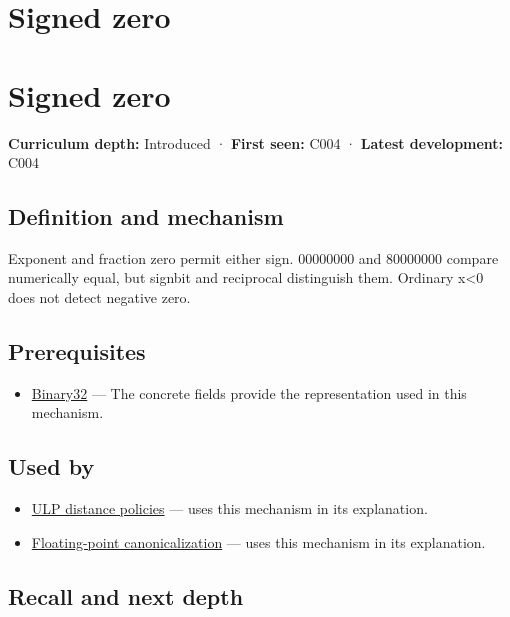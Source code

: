 \hypertarget{appendix-3a048f032c1f}{}
\section*{Signed zero}
\section{Signed zero}\label{appendix-3a048f032c1f-signed-zero}

\textbf{Curriculum depth:} Introduced · \textbf{First seen:} C004 · \textbf{Latest development:} C004

\subsection{Definition and mechanism}\label{appendix-3a048f032c1f-definition-and-mechanism}

Exponent and fraction zero permit either sign. 00000000 and 80000000 compare numerically equal, but signbit and reciprocal distinguish them. Ordinary x\textless0 does not detect negative zero.

\subsection{Prerequisites}\label{appendix-3a048f032c1f-prerequisites}

\begin{itemize}
\tightlist
\item
  \hyperref[appendix-5057f9ad327f]{Binary32} --- The concrete fields provide the representation used in this mechanism.
\end{itemize}

\subsection{Used by}\label{appendix-3a048f032c1f-used-by}

\begin{itemize}
\tightlist
\item
  \hyperref[appendix-deca299ae4b8]{ULP distance policies} --- uses this mechanism in its explanation.
\item
  \hyperref[appendix-e90053a4b201]{Floating-point canonicalization} --- uses this mechanism in its explanation.
\end{itemize}

\subsection{Recall and next depth}\label{appendix-3a048f032c1f-recall-and-next-depth}

